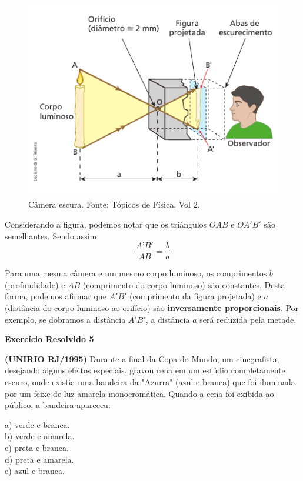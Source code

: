 \documentclass[11pt,twocolumn,oneside]{article}
\begin{document}
\begin{figure}[h]{}
\centering\includegraphics[width=2.5truein]{img22.png}
\caption{Câmera escura. Fonte: Tópicos de Física. Vol 2.}
\centering
\end{figure}

Considerando a figura, podemos notar que os triângulos $OAB$ e $OA'B'$ são semelhantes. Sendo assim:
\begin{equation*}
    \dfrac{A’B'}{AB}=\dfrac{b}{a}
\end{equation*}


Para uma mesma câmera e um mesmo corpo luminoso, os comprimentos \textbf{$b$} (profundidade) e \textbf{$AB$} (comprimento do corpo luminoso) são constantes. Desta forma, podemos afirmar que \textbf{$A'B'$} (comprimento da figura projetada) e \textbf{$a$} (distância do corpo luminoso ao orifício) são \textbf{inversamente proporcionais}. Por exemplo, se dobramos a distância \textbf{$A'B'$}, a distância \textbf{$a$} será reduzida pela metade.


\textbf{Exercício Resolvido 5}


\textbf{(UNIRIO RJ/1995)} Durante a final da Copa do Mundo, um cinegrafista, desejando alguns efeitos especiais, gravou cena em um estúdio completamente escuro, onde existia uma bandeira da "Azurra" (azul e branca) que foi iluminada por um feixe de luz amarela monocromática. Quando a cena foi exibida ao público, a bandeira apareceu:


a)	verde e branca. \\
b)	verde e amarela. \\
c)	preta e branca. \\
d)	preta e amarela. \\
e)	azul e branca.
\end{document}
